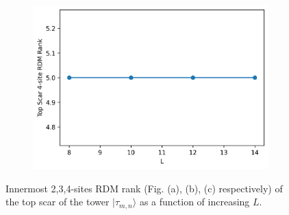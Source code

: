\documentclass[11pt]{article}
\begin{document}
\begin{itemize}
\begin{itemize}
\begin{figure}[H]
\begin{subfigure}{0.45\textwidth}
        \includegraphics[width=\linewidth]{hb_scar_4.png}
        \caption{}
        \label{fig:image3hb}
    \end{subfigure}

    \caption{Innermost 2,3,4-sites RDM  rank (Fig. (a), (b), (c) respectively) of the top scar of the tower $|\tau_{m,n}\rangle$ as a function of increasing $L$.}
    \label{fig:hb_scars_tower}
\end{figure}


\end{itemize}
\end{itemize}
\end{document}
